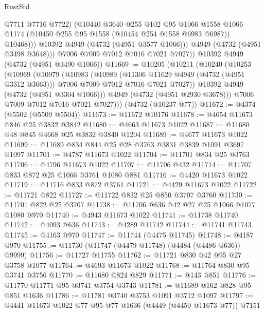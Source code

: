 \begin{lexlean}{RustStd}
\begin{coremodule}
                  @7711
                  @7716
                  @7722)
                (@10440
                  @3640
                  @255
                  @102
                  @95
                  @1066
                  @1558
                  @1066
                  @1174
                  (@10450 @255 @95 @1558 (@10454 @254 @1558 @6983 @6987))
                  @10468)))
            @10392
            @4949
            (@4732 (@4951 @3577 @1066)))
          @4949
          (@4732 (@4951 @3498 @3648)))
        @7006
        @7009
        @7012
        @7016
        @7021
        @7027))
    @10392
    @4949
    (@4732 (@4951 @3490 @1066))
@11669 := @10205
    (@10211
      (@10240
        (@10253
          (@10969
            (@10979
              (@10983
                (@10989
                  (@11306 @11629 @4949 (@4732 (@4951 @3312 @3663)))
                  @7006
                  @7009
                  @7012
                  @7016
                  @7021
                  @7027))
              @10392
              @4949
              (@4732 (@4951 @3304 @1066)))
            @4949
            (@4732 (@4951 @2930 @3678)))
          @7006
          @7009
          @7012
          @7016
          @7021
          @7027)))
    (@4732 (@10237 @77))
@11672 := @4374 (@5502 (@5509 @5504))
@11673 := @11672 @10176
@11678 := @4654 @11673 @846 @25 @3832 @3842
@11680 := @4663 @11673 @1022
@11687 := @11680 @48 @845 @4668 @25 @3832 @3840 @1204
@11689 := @4677 @11673 @1022
@11699 := @11689 @834 @844 @25 @28 @3763 @3831 @3839 @1091 @3697 @1097
@11701 := @4787 @11673 @1022
@11704 := @11701 @834 @25 @3763
@11706 := @4796 @11673 @1022
@11707 := @11706 @432
@11714 := @11707 @833 @872 @25 @1066 @3761 @1080 @881
@11716 := @4420 @11673 @1022
@11719 := @11716 @833 @872 @3761
@11721 := @4429 @11673 @1022
@11722 := @11721 @822
@11727 := @11722 @832 @25 @850 @3707 @3760
@11730 := @11701 @822 @25 @3707
@11738 := @11706 @636 @42 @27 @25 @1066 @1077 @1080 @970
@11740 := @4943 @11673 @1022
@11741 := @11738 @11740
@11742 := @4093 @636
@11743 := @4289 @11742
@11744 := @11741 @11743
@11745 := @4163 @970
@11747 := @11744 (@4475 @11745)
@11748 := @4187 @970
@11755 := @11730 (@11747 (@4479 @11748) (@4484 (@4486 @636)) @9999)
@11756 := @11727 @11755
@11762 := @11721 @830 @42 @95 @27 @3758 @1077
@11764 := @4693 @11673 @1022
@11768 := @11764 @830 @95 @3741 @3756
@11770 := @11680 @824 @829
@11771 := @143 @851
@11776 := @11770 @11771 @95 @3741 @3754 @3743
@11781 := @11689 @162 @828 @95 @851 @1636
@11786 := @11781 @3740 @3753 @1091 @3712 @1097
@11797 := @4441 @11673 @1022 @77 @95 @77 @1636 (@4449 (@4450 @11673 @77)) @7151

\end{coremodule}
\end{lexlean}
